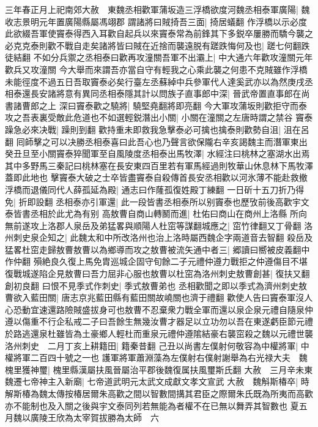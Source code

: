 三年春正月上祀南郊大赦　東魏丞相歡軍蒲坂造三浮橋欲度河魏丞相泰軍廣陽|{
	魏收志景明元年置廣陽縣屬馮翊郡}
謂諸將曰賊掎吾三面|{
	掎居蟻翻}
作浮橋以示必度此欲綴吾軍使竇泰得西入耳歡自起兵以來竇泰常為前鋒其下多鋭卒屢勝而驕今襲之必克克泰則歡不戰自走矣諸將皆曰賊在近捨而襲遠脱有蹉跌悔何及也|{
	蹉七何翻跌徒結翻}
不如分兵禦之丞相泰曰歡再攻潼關吾軍不出灞上|{
	中大通六年歡攻潼關元年歡兵又攻潼關}
今大舉而來謂吾亦當自守有輕我之心乘此襲之何患不克賊雖作浮橋未能徑度不過五日吾取竇泰必矣行臺左丞蘇綽中兵參軍代人達奚武亦以為然庚戌丞相泰還長安諸將意有異同丞相泰隱其計以問族子直事郎中深|{
	晉武帝置直事郎在尚書諸曹郎之上}
深曰竇泰歡之驍將|{
	驍堅堯翻將即亮翻}
今大軍攻蒲坂則歡拒守而泰攻之吾表裏受敵此危道也不如選輕鋭潛出小關|{
	小關在潼關之左唐時謂之禁谷}
竇泰躁急必來决戰|{
	躁則到翻}
歡持重未即救我急擊泰必可擒也擒泰則歡勢自沮|{
	沮在呂翻}
囘師擊之可以决勝丞相泰喜曰此吾心也乃聲言欲保隴右辛亥謁魏主而潛軍東出癸丑旦至小關竇泰猝聞軍至自風陵度丞相泰出馬牧澤|{
	水經注曰桃林之塞湖水出焉其中多野馬三秦記曰桃林塞在長安東四百里若有軍馬經過則牧華山休息林下馬牧澤蓋即此地也}
擊竇泰大破之士卒皆盡竇泰自殺傳首長安丞相歡以河氷薄不能赴救撤浮橋而退儀同代人薛孤延為殿|{
	通志曰作蕯孤復姓殿丁練翻}
一日斫十五刀折乃得免|{
	折即設翻}
丞相泰亦引軍還|{
	此一段皆書丞相泰所以别竇泰也歷攷前後高歡宇文泰皆書丞相於此尤為有别}
高敖曹自商山轉鬭而進|{
	杜佑曰商山在商州上洛縣}
所向無前遂攻上洛郡人泉岳及弟猛畧與順陽人杜窋等謀翻城應之|{
	窋竹律翻又丁骨翻}
洛州刺史泉企知之|{
	此魏太和中所改洛州也治上洛時屬西魏企字兩道音去智翻}
殺岳及猛畧杜窋走歸敖曹敖曹以為鄉導而攻之敖曹被流矢通中者三|{
	郷讀曰嚮被皮義翻中作仲翻}
殞絶良久復上馬免胄巡城企固守旬餘二子元禮仲遵力戰拒之仲遵傷目不堪復戰城遂陷企見敖曹曰吾力屈非心服也敖曹以杜窋為洛州刺史敖曹創甚|{
	復扶又翻創初良翻}
曰恨不見季式作刺史|{
	季式敖曹弟也}
丞相歡聞之即以季式為濟州刺史敖曹欲入藍田關|{
	唐志京兆藍田縣有藍田關故嶢關也濟于禮翻}
歡使人告曰竇泰軍沒人心恐動宜速還路險賊盛拔身可也敖曹不忍棄衆力戰全軍而還以泉企泉元禮自隨泉仲遵以傷重不行企私戒二子曰吾餘生無幾汝曹才器足以立功勿以吾在東遂虧臣節元禮於路逃還泉杜雖皆為土豪鄉人輕杜而重泉元禮仲遵隂結豪右襲窋殺之魏以元禮世襲洛州刺史　二月丁亥上耕籍田|{
	籍秦昔翻}
己丑以尚書左僕射何敬容為中權將軍|{
	中權將軍二百四十號之一也}
護軍將軍蕭淵藻為左僕射右僕射謝舉為右光禄大夫　魏槐里獲神璽|{
	槐里縣漢屬扶風晉屬治平郡後魏復属扶風璽斯氏翻}
大赦　三月辛未東魏遷七帝神主入新廟|{
	七帝道武明元太武文成獻文孝文宣武}
大赦　魏斛斯椿卒|{
	時解斯椿為魏太傳按椿居爾朱高歡之間以智數間搆其君臣之際爾朱氏既為所夷而高歡亦不能制也及入關之後與宇文泰同列若無能為者權不在已無以舞弄其智數也}
夏五月魏以廣陵王欣為太宰賀拔勝為太師　六

